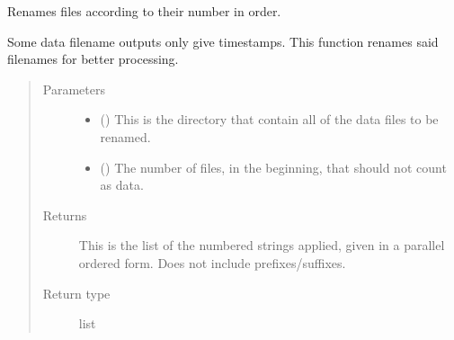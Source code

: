 \documentclass[letterpaper,10pt,english]{sphinxmanual}
\begin{document}
\begin{fulllineitems}
\label{\detokenize{python_docstrings/IfA_Smeargle.bravo.renaming:IfA_Smeargle.bravo.renaming.number_renaming}}
Renames files according to their number in order.

Some data filename outputs only give timestamps. This function renames
said filenames for better processing.
\begin{quote}\begin{description}
\item[{Parameters}] \leavevmode\begin{itemize}
\item {} 
 () \textendash{} This is the directory that contain all of the data files to be
renamed.

\item {} 
 (\sphinxstyleliteralemphasis{\sphinxupquote{ (}}\sphinxstyleliteralemphasis{\sphinxupquote{)}}) \textendash{} The number of files, in the beginning, that should not count as data.

\end{itemize}

\item[{Returns}] \leavevmode
{} \textendash{} This is the list of the numbered strings applied, given in a parallel
ordered form. Does not include prefixes/suffixes.

\item[{Return type}] \leavevmode
list

\end{description}\end{quote}

\end{fulllineitems}


\begin{fulllineitems}
\label{\detokenize{python_docstrings/IfA_Smeargle.bravo.renaming:IfA_Smeargle.bravo.renaming.parallel_renaming}}
\end{fulllineitems}
\end{document}
